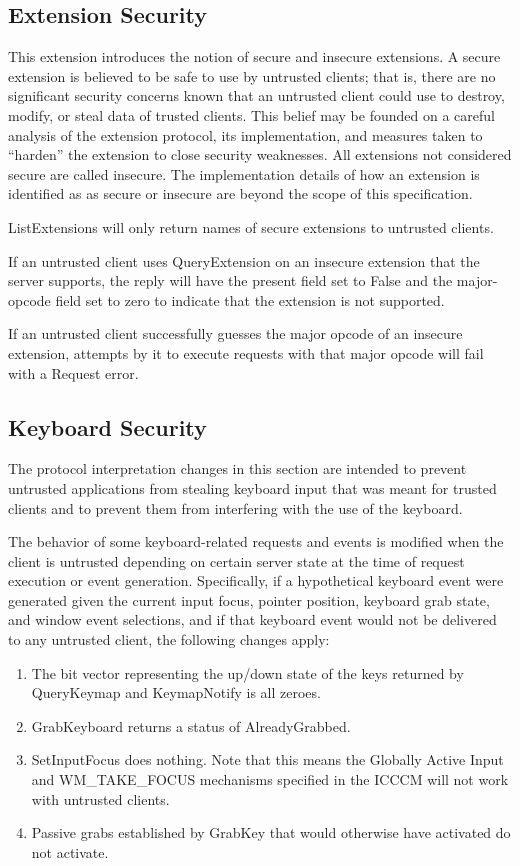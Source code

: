 \subsection{Extension Security}

This extension introduces the notion of secure and insecure
extensions.  A secure extension is believed to be safe to use by
untrusted clients; that is, there are no significant security concerns
known that an untrusted client could use to destroy, modify, or steal
data of trusted clients.  This belief may be founded on a careful
analysis of the extension protocol, its implementation, and measures
taken to ``harden'' the extension to close security weaknesses.  All
extensions not considered secure are called insecure.  The
implementation details of how an extension is identified as
as secure or insecure are beyond the scope of this specification.

ListExtensions will only return names of secure extensions to
untrusted clients.

If an untrusted client uses QueryExtension on an insecure extension
that the server supports, the reply will have the present field set to
False and the major-opcode field set to zero to indicate that the
extension is not supported.

If an untrusted client successfully guesses the major opcode of an
insecure extension, attempts by it to execute requests with that major
opcode will fail with a Request error.

\subsection{Keyboard Security}

The protocol interpretation changes in this section are intended to
prevent untrusted applications from stealing keyboard input that was
meant for trusted clients and to prevent them from interfering with
the use of the keyboard.

The behavior of some keyboard-related requests and events is modified
when the client is untrusted depending on certain server state at the
time of request execution or event generation.  Specifically, if a
hypothetical keyboard event were generated given the current input
focus, pointer position, keyboard grab state, and window event
selections, and if that keyboard event would not be delivered to any
untrusted client, the following changes apply:

\begin{enumerate}

\item The bit vector representing the up/down state of the keys
returned by QueryKeymap and KeymapNotify is all zeroes.
\item GrabKeyboard returns a status of AlreadyGrabbed.
\item SetInputFocus does nothing.  Note that this means
the Globally Active Input and WM\_TAKE\_FOCUS mechanisms specified
in the ICCCM will not work with untrusted clients.
\item Passive grabs established by GrabKey that would otherwise have
activated do not activate.

\end{enumerate}

